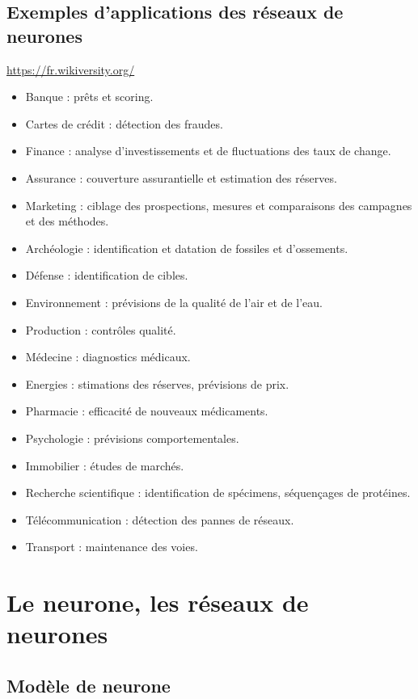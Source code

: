 \subsection{Exemples d'applications des réseaux de neurones}
\url{https://fr.wikiversity.org/}
\begin{itemize}
\item Banque	 : prêts et scoring.
\item Cartes de crédit	: détection des fraudes.
\item Finance	 : analyse d'investissements et de fluctuations des taux de change.
\item Assurance : couverture assurantielle et estimation des réserves.
\item Marketing : ciblage des prospections, mesures et comparaisons des campagnes et des méthodes.
\item Archéologie	 : identification et datation de fossiles et d'ossements.
\item Défense : identification de cibles.
\item Environnement : prévisions de la qualité de l'air et de l'eau.
\item Production : contrôles qualité.
\item Médecine : diagnostics médicaux.
\item Energies : stimations des réserves, prévisions de prix.
\item Pharmacie : efficacité de nouveaux médicaments.
\item Psychologie	: prévisions comportementales.
\item Immobilier : études de marchés.
\item Recherche scientifique : identification de spécimens, séquençages de protéines.
\item Télécommunication : détection des pannes de réseaux.
\item Transport : maintenance des voies.
\end{itemize}

\section{Le neurone, les réseaux de neurones}

\subsection{Modèle de neurone}


